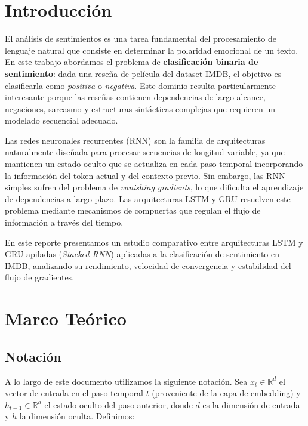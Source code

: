 \section{Introducción}

El análisis de sentimientos es una tarea fundamental del procesamiento de lenguaje natural que consiste en determinar la polaridad emocional de un texto. En este trabajo abordamos el problema de \textbf{clasificación binaria de sentimiento}: dada una reseña de película del dataset IMDB, el objetivo es clasificarla como \emph{positiva} o \emph{negativa}. Este dominio resulta particularmente interesante porque las reseñas contienen dependencias de largo alcance, negaciones, sarcasmo y estructuras sintácticas complejas que requieren un modelado secuencial adecuado.

Las redes neuronales recurrentes (RNN) son la familia de arquitecturas naturalmente diseñada para procesar secuencias de longitud variable, ya que mantienen un estado oculto que se actualiza en cada paso temporal incorporando la información del token actual y del contexto previo. Sin embargo, las RNN simples sufren del problema de \emph{vanishing gradients}, lo que dificulta el aprendizaje de dependencias a largo plazo. Las arquitecturas LSTM \cite{hochreiter1997} y GRU \cite{cho2014} resuelven este problema mediante mecanismos de compuertas que regulan el flujo de información a través del tiempo.

En este reporte presentamos un estudio comparativo entre arquitecturas LSTM y GRU apiladas (\emph{Stacked RNN}) aplicadas a la clasificación de sentimiento en IMDB, analizando su rendimiento, velocidad de convergencia y estabilidad del flujo de gradientes.

\section{Marco Teórico}

\subsection{Notación}

A lo largo de este documento utilizamos la siguiente notación. Sea $x_t \in \mathbb{R}^d$ el vector de entrada en el paso temporal $t$ (proveniente de la capa de embedding) y $h_{t-1} \in \mathbb{R}^h$ el estado oculto del paso anterior, donde $d$ es la dimensión de entrada y $h$ la dimensión oculta. Definimos:

